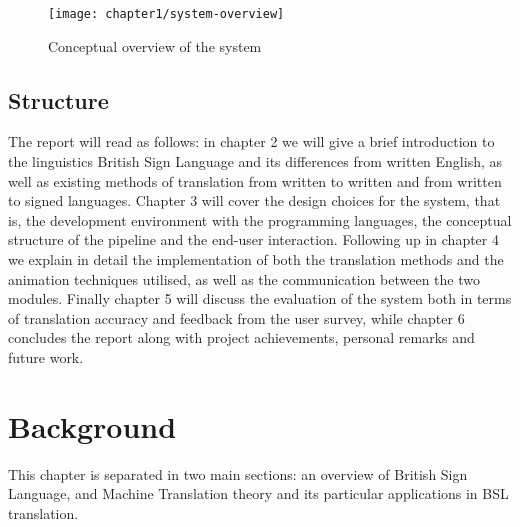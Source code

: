 \documentclass[12pt]{ociamthesis}  %
\begin{document}
\begin{figure}[h]
	\centering
    \texttt{[image: chapter1/system-overview]}
    \caption{Conceptual overview of the system}
    \label{fig:sys-overview}
\end{figure}

\section{Structure}
The report will read as follows: in chapter 2 we will give a brief introduction to the linguistics British Sign Language and its differences from written English, as well as existing methods of translation from written to written and from written to signed languages. Chapter 3 will cover the design choices for the system, that is, the development environment with the programming languages, the conceptual structure of the pipeline and the end-user interaction. Following up in chapter 4 we explain in detail the implementation of both the translation methods and the animation techniques utilised, as well as the communication between the two modules. Finally chapter 5 will discuss the evaluation of the system both in terms of translation accuracy and feedback from the user survey, while chapter 6 concludes the report along with project achievements, personal remarks and future work.


\chapter{Background}
This chapter is separated in two main sections: an overview of British Sign Language, and Machine Translation theory and its particular applications in BSL translation. 
\end{document}
